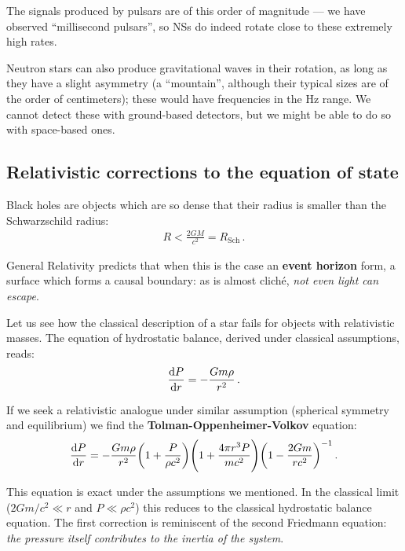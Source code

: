 \documentclass[main.tex]{subfiles}
\begin{document}
The signals produced by pulsars are of this order of magnitude --- we have observed ``millisecond pulsars'', so NSs do indeed rotate close to these extremely high rates.

Neutron stars can also produce gravitational waves in their rotation, as long as they have a slight asymmetry (a ``mountain'', although their typical sizes are of the order of centimeters); these would have frequencies in the Hz range. We cannot detect these with ground-based detectors, but we might be able to do so with space-based ones. 

\subsection{Relativistic corrections to the equation of state}

Black holes are objects which are so dense that their radius is smaller than the Schwarzschild radius:
%
\begin{align}
R < \frac{2GM}{c^2} = R _{\text{Sch}}
\,.
\end{align}

General Relativity predicts that when this is the case an \textbf{event horizon} form, a surface which forms a causal boundary: as is almost cliché, \emph{not even light can escape}.

Let us see how the classical description of a star fails for objects with relativistic masses.
The equation of hydrostatic balance, derived under classical assumptions, reads:
%
\begin{align}
\dv{P}{r} = - \frac{Gm \rho }{r^2}
\,.
\end{align}
%

If we seek a relativistic analogue under similar assumption (spherical symmetry and equilibrium) we find the \textbf{Tolman-Oppenheimer-Volkov} equation: 
%
\begin{align}
\dv{P}{r} = - \frac{Gm  \rho }{r^2} \qty(1 + \frac{P}{\rho c^2}) \qty(1 + \frac{4 \pi r^3 P}{m c^2}) \qty(1 - \frac{2Gm}{rc^2})^{-1}
\,.
\end{align}
%

This equation is exact under the assumptions we mentioned. 
In the classical limit (\(2Gm/ c^2 \ll r\) and \(P \ll \rho c^2\)) this reduces to the classical hydrostatic balance equation.
The first correction is reminiscent of the second Friedmann equation: \emph{the pressure itself contributes to the inertia of the system}. 
\end{document}
